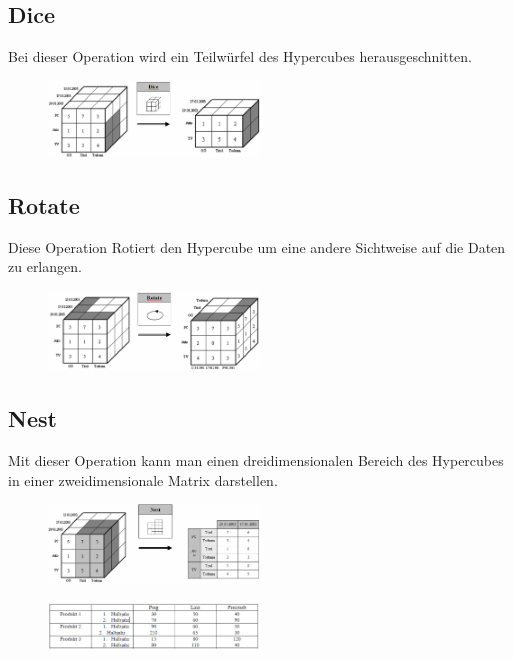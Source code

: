 \subsection{Dice}

Bei dieser Operation wird ein Teilwürfel des Hypercubes herausgeschnitten.
\begin{figure}[H]
    \centering
    \includegraphics[width=0.5\textwidth]{Content/images/dwh/dice.png}
    \caption{}
\end{figure}

\subsection{Rotate}

Diese Operation Rotiert den Hypercube um eine andere Sichtweise auf die Daten zu erlangen.
\begin{figure}[H]
    \centering
    \includegraphics[width=0.5\textwidth]{Content/images/dwh/rotate.png}
    \caption{}
\end{figure}

\subsection{Nest}

Mit dieser Operation kann man einen dreidimensionalen Bereich des Hypercubes in einer zweidimensionale Matrix darstellen.
\begin{figure}[H]
    \centering
    \includegraphics[width=0.5\textwidth]{Content/images/dwh/nest.png}
    \caption{}
\end{figure}
\begin{figure}[H]
    \centering
    \includegraphics[width=0.5\textwidth]{Content/images/dwh/table.png}
    \caption{}
\end{figure}

